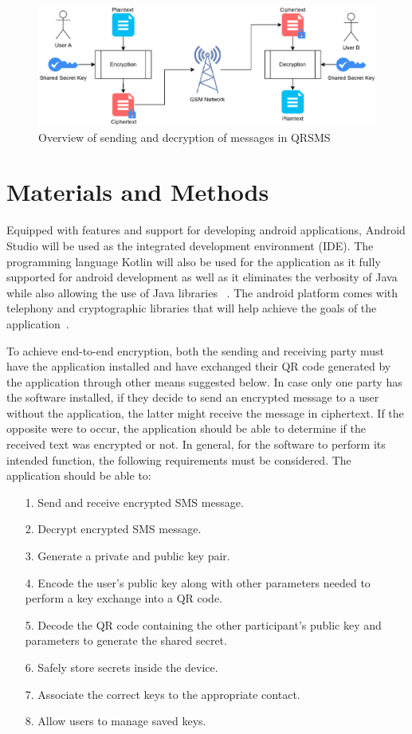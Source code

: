 \documentclass[journal]{./IEEE/IEEEtran}
\begin{document}
\begin{figure}
	\centering
	\includegraphics[width=6in]{images/encrypted_messaging.eps}
	\caption{Overview of sending and decryption of messages in
		QRSMS}
	\label{encrypted}
\end{figure}

\section{Materials and Methods}
Equipped with features and support for developing android applications,
Android Studio will be used as the integrated development environment (IDE).
The programming language Kotlin will also be used for the application as it
fully supported for android development as well as it eliminates the verbosity
of Java while also allowing the use of Java libraries
~\cite{Moskala_Wojda_2017}. The android platform comes with telephony and
cryptographic libraries that will help achieve the goals of the
application~\cite{android_pkg}.

To achieve end-to-end encryption, both the sending and receiving party must
have the application installed and have exchanged their QR code generated by
the application through other means suggested below. In case only one party
has the software installed, if they decide to send an encrypted message to
a user without the application, the latter might receive the message in
ciphertext. If the opposite were to occur, the application should be able to
determine if the received text was encrypted or not. In general, for the
software to perform its intended function, the following requirements must
be considered. The application should be able to:
\begin{itemize}
	\item[1.] Send and receive encrypted SMS message.
	\item[2.] Decrypt encrypted SMS message.
	\item[3.] Generate a private and public key pair.
	\item[4.] Encode the user's public key along with other parameters
		needed to perform a key exchange into a QR code.
	\item[5.] Decode the QR code containing the other participant's public
		key and parameters to generate the shared secret.
	\item[6.] Safely store secrets inside the device.
	\item[7.] Associate the correct keys to the appropriate contact.
	\item[8.] Allow users to manage saved keys.
\end{itemize}
\end{document}
